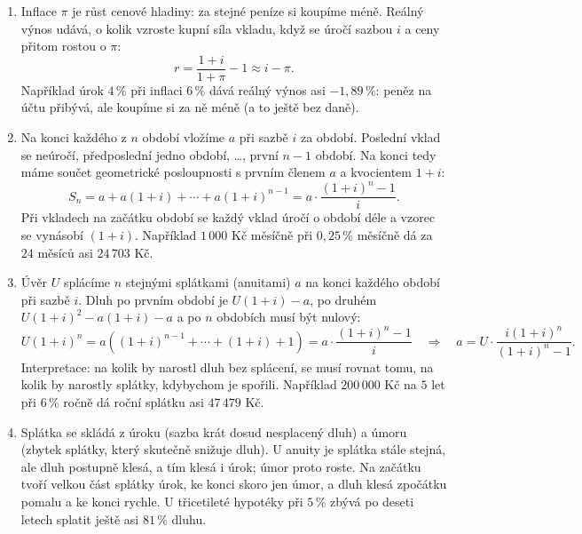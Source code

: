 \begin{enumerate}[label=\textbf{\arabic*.}, leftmargin=*, itemsep=0.8em]
  \item {}
  Inflace $\pi$ je růst cenové hladiny: za stejné peníze si koupíme méně. Reálný výnos udává, o kolik vzroste kupní síla vkladu, když se úročí sazbou $i$ a ceny přitom rostou o $\pi$:
  \begin{equation*}
    r = \frac{1 + i}{1 + \pi} - 1 \approx i - \pi.
  \end{equation*}
  Například úrok $4\,\%$ při inflaci $6\,\%$ dává reálný výnos asi $-1{,}89\,\%$: peněz na účtu přibývá, ale koupíme si za ně méně (a to ještě bez daně). 

  \item {}
  Na konci každého z $n$ období vložíme $a$ při sazbě $i$ za období. Poslední vklad se neúročí, předposlední jedno období, \ldots, první $n - 1$ období. Na konci tedy máme součet geometrické posloupnosti s prvním členem $a$ a kvocientem $1 + i$:
  \begin{equation*}
    S_n = a + a(1 + i) + \cdots + a{(1 + i)}^{n-1} = a\cdot\frac{{(1 + i)}^n - 1}{i}.
  \end{equation*}
  Při vkladech na začátku období se každý vklad úročí o období déle a vzorec se vynásobí $(1 + i)$. Například $1\,000$ Kč měsíčně při $0{,}25\,\%$ měsíčně dá za $24$ měsíců asi $24\,703$ Kč. 

  \item {}
  Úvěr $U$ splácíme $n$ stejnými splátkami (anuitami) $a$ na konci každého období při sazbě $i$. Dluh po prvním období je $U(1 + i) - a$, po druhém $U{(1 + i)}^2 - a(1 + i) - a$ a po $n$ obdobích musí být nulový:
  \begin{equation*}
    U{(1 + i)}^n = a\left({(1 + i)}^{n-1} + \cdots + (1 + i) + 1\right) = a\cdot\frac{{(1 + i)}^n - 1}{i}
    \quad\Rightarrow\quad a = U\cdot\frac{i{(1 + i)}^n}{{(1 + i)}^n - 1}.
  \end{equation*}
  Interpretace: na kolik by narostl dluh bez splácení, se musí rovnat tomu, na kolik by narostly splátky, kdybychom je spořili. Například $200\,000$ Kč na $5$ let při $6\,\%$ ročně dá roční splátku asi $47\,479$ Kč. 

  \item {}
  Splátka se skládá z úroku (sazba krát dosud nesplacený dluh) a úmoru (zbytek splátky, který skutečně snižuje dluh). U anuity je splátka stále stejná, ale dluh postupně klesá, a tím klesá i úrok; úmor proto roste. Na začátku tvoří velkou část splátky úrok, ke konci skoro jen úmor, a dluh klesá zpočátku pomalu a ke konci rychle. U třicetileté hypotéky při $5\,\%$ zbývá po deseti letech splatit ještě asi $81\,\%$ dluhu. 


\end{enumerate}
